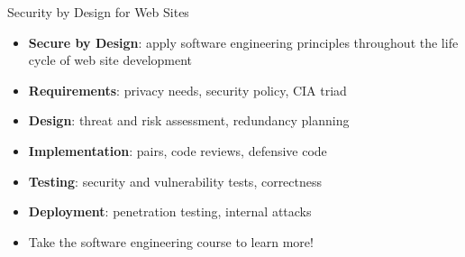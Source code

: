 \documentclass[14pt,aspectratio=169]{beamer}
\begin{document}
%
\begin{frame}{Security by Design for Web Sites}
  \begin{itemize}
    \item {\bf Secure by Design}: apply software engineering principles
      throughout the life cycle of web site development
      \vspace*{-.15in}
    \item {\bf Requirements}: privacy needs, security policy, CIA triad
      \vspace*{-.15in}
    \item {\bf Design}: threat and risk assessment, redundancy planning
      \vspace*{-.15in}
    \item {\bf Implementation}: pairs, code reviews, defensive code
      \vspace*{-.15in}
    \item {\bf Testing}: security and vulnerability tests, correctness
      \vspace*{-.15in}
    \item {\bf Deployment}: penetration testing, internal attacks
      \vspace*{-.15in}
    \item Take the software engineering course to learn more!
  \end{itemize}
\end{frame}
\end{document}
